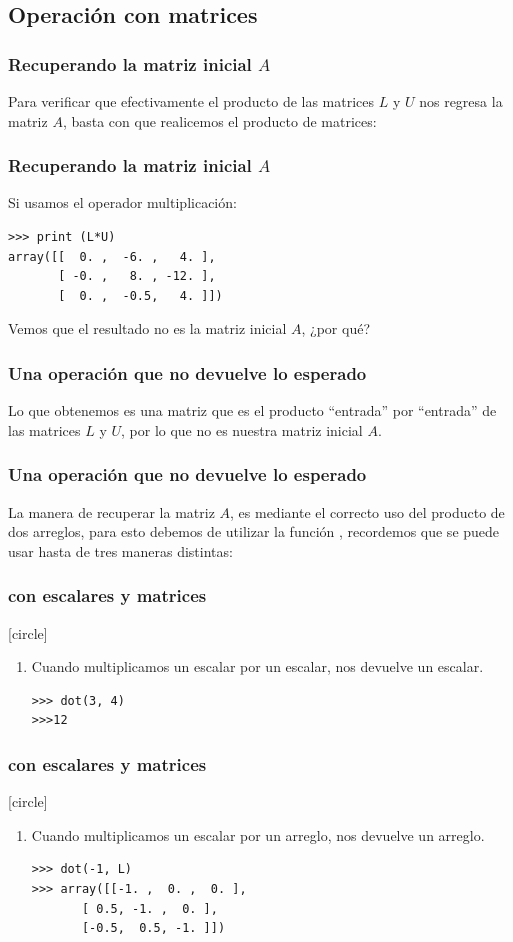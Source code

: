 \subsection{Operación con matrices}
\begin{frame}[fragile]
\frametitle{Recuperando la matriz inicial $A$}
Para verificar que efectivamente el producto de las matrices $L$ y $U$ nos regresa la matriz $A$, basta con que realicemos el producto de matrices:
\end{frame}
\begin{frame}[fragile]
\frametitle{Recuperando la matriz inicial $A$}
Si usamos el operador multiplicación:
\begin{verbatim}
>>> print (L*U)
array([[  0. ,  -6. ,   4. ],
       [ -0. ,   8. , -12. ],
       [  0. ,  -0.5,   4. ]])

\end{verbatim}
\pause
Vemos que el resultado no es la matriz inicial $A$, ¿por qué?
\end{frame}
\begin{frame}
\frametitle{Una operación que no devuelve lo esperado}
Lo que obtenemos es una matriz que es el producto \enquote{entrada} por \enquote{entrada} de las matrices $L$ y $U$, por lo que no es nuestra matriz inicial $A$.
\end{frame}
\begin{frame}
\frametitle{Una operación que no devuelve lo esperado}
La manera de recuperar la matriz $A$, es mediante el correcto uso del producto de dos arreglos, para esto debemos de utilizar la función , recordemos que se puede usar hasta de tres maneras distintas:
\end{frame}
\begin{frame}[fragile]
\frametitle{ con escalares y matrices}
[circle]
\begin{enumerate}[<+->]
\item Cuando multiplicamos un escalar por un escalar, nos devuelve un escalar. \\
\begin{verbatim}
>>> dot(3, 4)
>>>12
\end{verbatim}
\seti
\end{enumerate}
\end{frame}
\begin{frame}[fragile]
\frametitle{ con escalares y matrices}
[circle]
\begin{enumerate}[<+->]
\conti
\item Cuando multiplicamos un escalar por un arreglo, nos devuelve un arreglo.\\
\begin{verbatim}
>>> dot(-1, L)
>>> array([[-1. ,  0. ,  0. ],
       [ 0.5, -1. ,  0. ],
       [-0.5,  0.5, -1. ]])
\end{verbatim}
\seti
\end{enumerate}
\end{frame}
